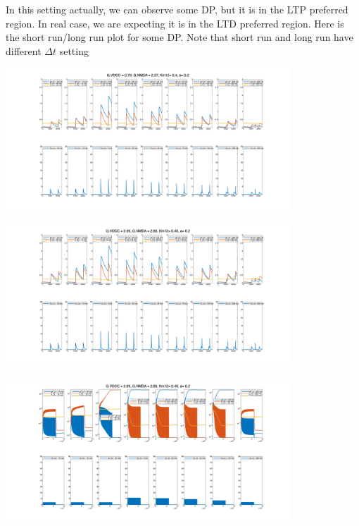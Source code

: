 \documentclass{article}
\begin{document}
In this setting actually, we can observe some DP, but it is in the LTP preferred region. In real case, we are expecting it is in the LTD preferred region. Here is the short run/long run plot for some DP. Note that short run and long run have different $\Delta t$ setting\\
\begin{minipage}{\textwidth} %
    \centering
    \includegraphics[width=0.8\textwidth]{G_VDCC=0.79_G_NMDA=2.37_Km12=0.400_a=0.20.png} %
    \label{fig:a0.25}
\end{minipage}
\begin{minipage}{\textwidth} %
    \centering
    \includegraphics[width=0.8\textwidth]{G_VDCC=0.95_G_NMDA=2.85_Km12=0.450_a=0.20.png} %
    \label{fig:a0.25}
\end{minipage}
\begin{minipage}{\textwidth} %
    \centering
    \includegraphics[width=0.8\textwidth]{G_VDCC=0.95_G_NMDA=2.85_Km12=0.450_a=0.20_long.png} %
    \label{fig:a0.25}
\end{minipage}
\end{document}
